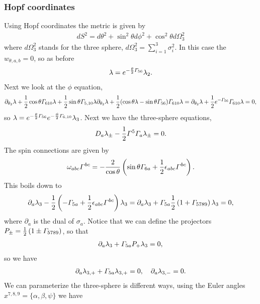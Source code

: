 \documentclass[11pt]{article}
\let\oldGamma=\Gamma
\renewcommand{\Gamma}{\mathnormal{\oldGamma}}
\newcommand{\sfrac}[2]{{\textstyle\frac{#1}{#2}}}
\newcommand{\p}{\partial}\newcommand{\quarter}{\sfrac{1}{4}}
\begin{document}
\subsubsection{Hopf coordinates}
Using Hopf coordinates the metric is given by
\begin{align}
dS^2 = d\theta^2 + \sin^2\theta d\phi^2 +\cos^2\theta d\Omega_3^2
\end{align}
where $d\Omega_3^2$ stands for the three sphere, $d\Omega_3^2 = \sum_{i=1}^{3}\sigma_i^2$.
In this case the $w_{\theta,a,b} = 0$, so as before
\begin{align}
\lambda = e^{- \frac{\theta}{2}\Gamma_{56}}\lambda_2.
\end{align}
Next we look at the $\phi$ equation,
\begin{align}
\p_{\theta_2}\lambda + \frac{1}{2}\cos\theta\Gamma_{610}\lambda+ \frac{1}{2}\sin\theta\Gamma_{5,10}\lambda
\p_{\theta_2}\lambda + \frac{1}{2}(\cos\theta\lambda-\sin\theta\Gamma_{56})\Gamma_{610}\lambda
=\p_{\theta_2}\lambda +\frac{1}{2}e^{-\Gamma_{56}}\Gamma_{610}\lambda = 0,
\end{align}
so $\lambda = e^{- \frac{\theta}{2}\Gamma_{56}}e^{- \frac{\phi}{2}\Gamma_{6,10}}\lambda_3$.
Next we have the three-sphere equations,
\begin{align}
D_a \lambda_\pm-\frac{1}{2}\Gamma^5\Gamma_a \lambda_\pm = 0.
\end{align}
The spin connections are given by
\begin{align}
\omega_{abc}\Gamma^{bc} = -\frac{2}{\cos\theta}\left(\sin\theta \Gamma_{6a} + \frac{1}{2}\epsilon_{abc}\Gamma^{bc}\right).
\end{align}
This boils down to
\begin{align}
\p_a\lambda_3 - \frac{1}{2}\left(-\Gamma_{5a} + \frac{1}{2}\epsilon_{abc}\Gamma^{bc}\right)\lambda_3
= \p_a\lambda_3 + \Gamma_{5a} \frac{1}{2}\left(1 + \Gamma_{5789} \right)\lambda_3 = 0,
\end{align}
where $\p_a$ is the dual of $\sigma_a$.
Notice that we can define the projectors $P_{\pm} = \frac{1}{2}\left(1 \pm \Gamma_{5789} \right)$, so that
\begin{align}
\p_a\lambda_3 + \Gamma_{5a} P_+ \lambda_3 = 0,
\end{align}
so we have
\begin{align}
\p_a\lambda_{3,+} + \Gamma_{5a} \lambda_{3,+} = 0,\quad
\p_a\lambda_{3,-} = 0.
\end{align}
We can parameterize the three-sphere is different ways, using the Euler angles ${x^{7,8,9} = \{\alpha,\beta,\psi\}}$ we have
\end{document}
